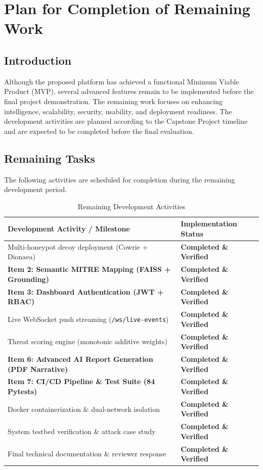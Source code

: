\documentclass[12pt,a4paper]{report}
\begin{document}
\chapter{Plan for Completion of Remaining Work}

\section{Introduction}

Although the proposed platform has achieved a functional Minimum Viable Product (MVP), several advanced features remain to be implemented before the final project demonstration. The remaining work focuses on enhancing intelligence, scalability, security, usability, and deployment readiness. The development activities are planned according to the Capstone Project timeline and are expected to be completed before the final evaluation.


\section{Remaining Tasks}

The following activities are scheduled for completion during the remaining development period.

\begin{table}[H]
\centering
\caption{Remaining Development Activities}
\begin{tabular}{|p{7.5cm}|p{4.5cm}|}
\hline
\textbf{Development Activity / Milestone} & \textbf{Implementation Status} \\
\hline
Multi-honeypot decoy deployment (Cowrie + Dionaea) & \textbf{Completed \& Verified} \\
\hline
\textbf{Item 2: Semantic MITRE Mapping (FAISS + Grounding)} & \textbf{Completed \& Verified} \\
\hline
\textbf{Item 3: Dashboard Authentication (JWT + RBAC)} & \textbf{Completed \& Verified} \\
\hline
Live WebSocket push streaming (\texttt{/ws/live-events}) & \textbf{Completed \& Verified} \\
\hline
Threat scoring engine (monotonic additive weights) & \textbf{Completed \& Verified} \\
\hline
\textbf{Item 6: Advanced AI Report Generation (PDF Narrative)} & \textbf{Completed \& Verified} \\
\hline
\textbf{Item 7: CI/CD Pipeline \& Test Suite (84 Pytests)} & \textbf{Completed \& Verified} \\
\hline
Docker containerization \& dual-network isolation & \textbf{Completed \& Verified} \\
\hline
System testbed verification \& attack case study & \textbf{Completed \& Verified} \\
\hline
Final technical documentation \& reviewer response & \textbf{Completed \& Verified} \\
\hline
\end{tabular}
\end{table}
\end{document}

